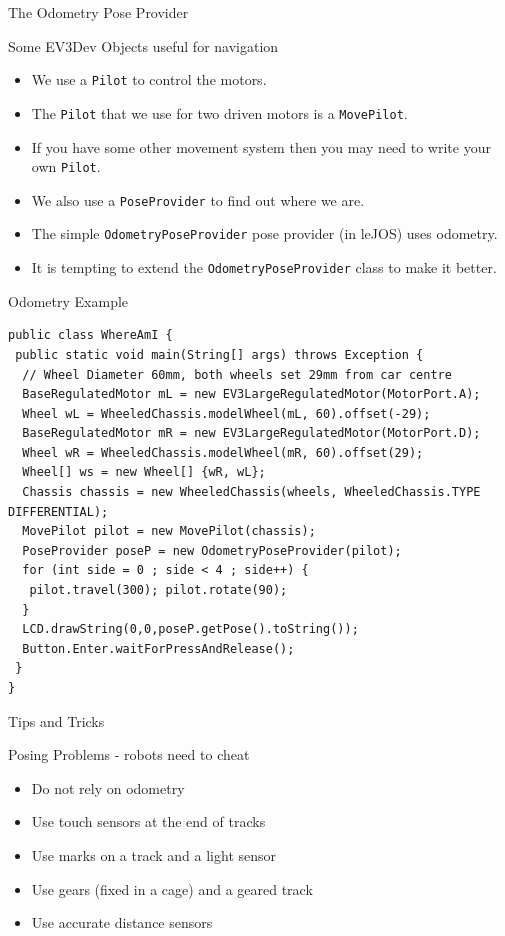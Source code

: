 \documentclass[color=pdftex,usenames,dvipsnames, aspectratio=169]{beamer}
\begin{document}
\begin{frame}{The Odometry Pose Provider}
\begin{block}{Some EV3Dev Objects useful for navigation}
\begin{itemize}
\item We use a \lstinline!Pilot! to control the motors.
\item The \lstinline!Pilot! that we use for two driven motors is a \lstinline!MovePilot!.
\item \textcolor{RedOrange}{If you have some other movement system then you may need to write your own \lstinline!Pilot!.}
\item We also use a \lstinline!PoseProvider! to find out where we are.
\item The simple \lstinline!OdometryPoseProvider! pose provider (in leJOS) uses odometry.
\item \textcolor{RedOrange}{It is tempting to extend the \lstinline!OdometryPoseProvider! class to make it better.}
\end{itemize}
\end{block}
\end{frame}

\begin{frame}[fragile]{Odometry Example}
\begin{lstlisting}[emph={poseP, pilot},linewidth=14cm,basicstyle=\ttfamily\scriptsize\color{blue}]
public class WhereAmI {
 public static void main(String[] args) throws Exception {
  // Wheel Diameter 60mm, both wheels set 29mm from car centre
  BaseRegulatedMotor mL = new EV3LargeRegulatedMotor(MotorPort.A);
  Wheel wL = WheeledChassis.modelWheel(mL, 60).offset(-29); 
  BaseRegulatedMotor mR = new EV3LargeRegulatedMotor(MotorPort.D);
  Wheel wR = WheeledChassis.modelWheel(mR, 60).offset(29);
  Wheel[] ws = new Wheel[] {wR, wL};
  Chassis chassis = new WheeledChassis(wheels, WheeledChassis.TYPE DIFFERENTIAL);
  MovePilot pilot = new MovePilot(chassis);
  PoseProvider poseP = new OdometryPoseProvider(pilot);
  for (int side = 0 ; side < 4 ; side++) {
   pilot.travel(300); pilot.rotate(90);
  }
  LCD.drawString(0,0,poseP.getPose().toString());
  Button.Enter.waitForPressAndRelease();
 }  
}
\end{lstlisting}
\end{frame}

\begin{frame}{Tips and Tricks}
\begin{block}{Posing Problems - robots need to cheat}
\begin{itemize}
  \item \alert{Do not rely on odometry}
  \item \textcolor{OliveGreen}{Use touch sensors at the end of tracks}
  \item \textcolor{OliveGreen}{Use marks on a track and a light sensor}
  \item \textcolor{OliveGreen}{Use gears (fixed in a cage) and a geared track}
  \item \textcolor{OliveGreen}{Use accurate distance sensors}
\end{itemize}
\end{block}
\end{frame}
\end{document}
